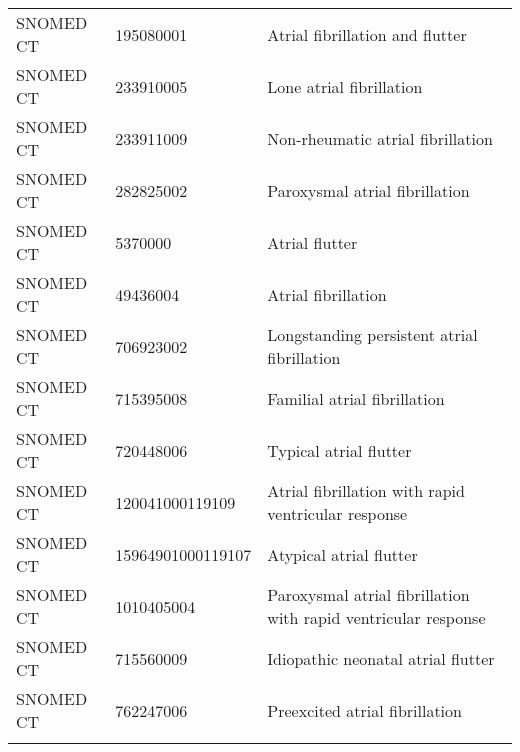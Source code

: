 \begin{longtable}{p{}p{}p{}}
  SNOMED CT & 195080001 & Atrial fibrillation and flutter \\ 
  SNOMED CT & 233910005 & Lone atrial fibrillation \\ 
  SNOMED CT & 233911009 & Non-rheumatic atrial fibrillation \\ 
  SNOMED CT & 282825002 & Paroxysmal atrial fibrillation \\ 
  SNOMED CT & 5370000 & Atrial flutter \\ 
  SNOMED CT & 49436004 & Atrial fibrillation \\ 
  SNOMED CT & 706923002 & Longstanding persistent atrial fibrillation \\ 
  SNOMED CT & 715395008 & Familial atrial fibrillation \\ 
  SNOMED CT & 720448006 & Typical atrial flutter \\ 
  SNOMED CT & 120041000119109 & Atrial fibrillation with rapid ventricular response \\ 
  SNOMED CT & 15964901000119107 & Atypical atrial flutter \\ 
  SNOMED CT & 1010405004 & Paroxysmal atrial fibrillation with rapid ventricular response \\ 
  SNOMED CT & 715560009 & Idiopathic neonatal atrial flutter \\ 
  SNOMED CT & 762247006 & Preexcited atrial fibrillation \\ 
  \hline
\label{tab:codes_atrial-fibrillation-flutter}
\end{longtable}
